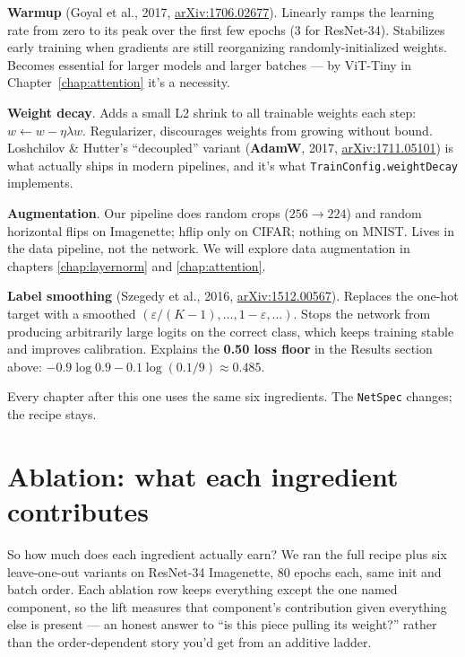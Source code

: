 \textbf{Warmup} (Goyal et al., 2017,
\href{https://arxiv.org/abs/1706.02677}{arXiv:1706.02677}). Linearly
ramps the learning rate from zero to its
peak over the first few epochs (3 for ResNet-34). Stabilizes early
training when gradients are still reorganizing randomly-initialized
weights. Becomes essential for larger models and larger batches --- by
ViT-Tiny in Chapter~\ref{chap:attention} it's a necessity.

\textbf{Weight decay}. Adds a small L2 shrink to all trainable weights
each step: $w \leftarrow w - \eta \lambda w$. Regularizer, discourages
weights from growing without bound. Loshchilov \& Hutter's
``decoupled'' variant (\textbf{AdamW}, 2017,
\href{https://arxiv.org/abs/1711.05101}{arXiv:1711.05101}) is what
actually ships in modern
pipelines, and it's what \texttt{TrainConfig.weightDecay} implements.

\textbf{Augmentation}. Our pipeline does random crops ($256 \to 224$)
and random horizontal flips on Imagenette; hflip only on CIFAR;
nothing on MNIST. Lives in the data pipeline, not the network. We
will explore data augmentation in chapters \ref{chap:layernorm}
and \ref{chap:attention}.

\textbf{Label smoothing} (Szegedy et al., 2016,
\href{https://arxiv.org/abs/1512.00567}{arXiv:1512.00567}). Replaces
the one-hot
target with a smoothed $(\varepsilon / (K-1), \ldots, 1 - \varepsilon,
\ldots)$. Stops the network from producing arbitrarily large logits on
the correct class, which keeps training stable and improves calibration.
Explains the \textbf{0.50 loss floor} in the Results section above:
$-0.9 \log 0.9 - 0.1 \log (0.1/9) \approx 0.485$.

Every chapter after this one uses the same six ingredients. The
\texttt{NetSpec} changes; the recipe stays.

\section{Ablation: what each ingredient contributes}
\label{sec:r34_ablation}

So how much does each ingredient actually earn? We ran the full
recipe plus six leave-one-out variants on ResNet-34 Imagenette, 80
epochs each, same init and batch order. Each ablation row keeps
everything except the one named component, so the lift measures
that component's contribution given everything else is present ---
an honest answer to ``is this piece pulling its weight?'' rather
than the order-dependent story you'd get from an additive ladder.

